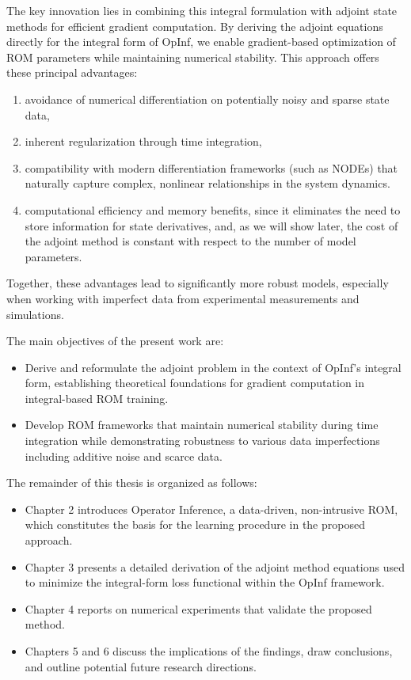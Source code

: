 The key innovation lies in combining this integral formulation with adjoint state methods for efficient gradient computation. By deriving the adjoint equations directly for the integral form of OpInf, we enable gradient-based optimization of ROM parameters while maintaining numerical stability. This approach offers these principal advantages: 

\begin{enumerate}[label=(\roman*)]
  \item avoidance of numerical differentiation on potentially noisy and sparse state data,
  \item inherent regularization through time integration, 
  \item compatibility with modern differentiation frameworks (such as NODEs) that naturally capture complex, nonlinear relationships in the system dynamics.
  \item computational efficiency and memory benefits, since it eliminates the need to store information for state derivatives, and, as we will show later, the cost of the adjoint method is constant with respect to the number of model parameters.
\end{enumerate}

 Together, these advantages lead to significantly more robust models, especially when working with imperfect data from experimental measurements and simulations.

\newpage

The main objectives of the present work are:
\begin{itemize}
    \item Derive and reformulate the adjoint problem in the context of OpInf's integral form, establishing theoretical foundations for gradient computation in integral-based ROM training.
    \item Develop ROM frameworks that maintain numerical stability during time integration while demonstrating robustness to various data imperfections including additive noise and scarce data.
\end{itemize}

The remainder of this thesis is organized as follows:
\begin{itemize}
    \item Chapter 2 introduces Operator Inference, a data-driven, non-intrusive ROM, which constitutes the basis for the learning procedure in the proposed approach.
    \item Chapter 3 presents a detailed derivation of the adjoint method equations used to minimize the integral-form loss functional within the OpInf framework.
    \item Chapter 4 reports on numerical experiments that validate the proposed method.
    \item Chapters 5 and 6 discuss the implications of the findings, draw conclusions, and outline potential future research directions.
\end{itemize}




